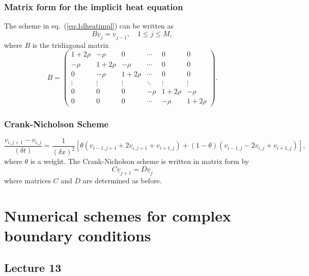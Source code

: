 \documentclass{article}
\begin{document}
\subsubsection{Matrix form for the implicit heat equation}
The scheme in eq.~(\ref{eq:1dheatimpl}) can be written as
\begin{equation}
    B\underline{v}_j=\underline{v}_{j-1},\quad 1\leq j\leq M,\nonumber
\end{equation}
where $B$ is the tridiagonal matrix
\begin{equation}
    B = 
    \begin{pmatrix}
        1+2\rho & -\rho & 0 & \cdots & 0 & 0 \\
        -\rho & 1+2\rho & -\rho & \cdots & 0 & 0 \\
        0 & -\rho & 1+2\rho & \cdots & 0 & 0 \\
        \vdots & \vdots & \vdots & \ddots & \vdots & \vdots \\
        0 & 0 & 0 & -\rho & 1+2\rho & -\rho \\
        0 & 0 & 0 & \cdots & -\rho & 1+2\rho  
    \end{pmatrix}.
\end{equation}
\subsubsection{Crank-Nicholson Scheme}
\begin{equation}
    \frac{v_{i,j+1}-v_{i,j}}{(\delta t)}=\frac{1}{(\delta x)^2}[\theta(v_{i-1,j+1}+2v_{i,j+1}+v_{i+1,j})+(1-\theta)(v_{i-1,j}-2v_{i,j}+v_{i+1,j})],
\end{equation}
where $\theta$ is a weight. The Crank-Nicholson scheme is written in matrix form by
\begin{equation}
    C\underline{v}_{j+1} = D\underline{v}_j \nonumber
\end{equation}
where matrices $C$ and $D$ are determined as before.


\section{Numerical schemes for complex boundary conditions}
\subsection{Lecture 13}
\subsubsection{}
\end{document}

